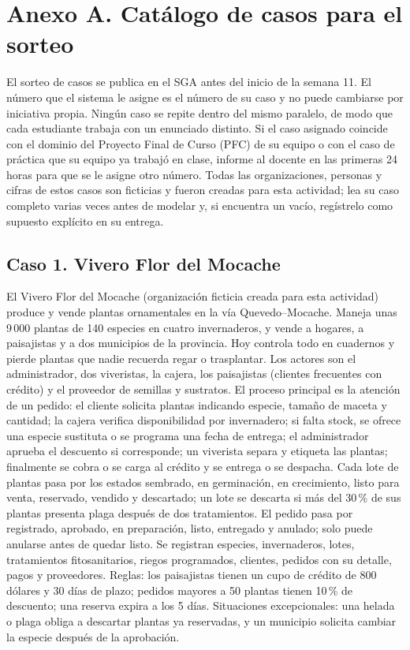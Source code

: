 \documentclass[11pt]{article}
\newcommand{\seccion}[1]{\section{\textcolor{utegreendk}{#1}}}
\newcommand{\subseccion}[1]{\subsection{\textcolor{midblue}{#1}}}
\begin{document}
\clearpage
\seccion{Anexo A. Catálogo de casos para el sorteo}

El sorteo de casos se publica en el SGA antes del inicio de la semana 11. El número que el sistema le asigne es el número de su caso y no puede cambiarse por iniciativa propia. Ningún caso se repite dentro del mismo paralelo, de modo que cada estudiante trabaja con un enunciado distinto. Si el caso asignado coincide con el dominio del Proyecto Final de Curso (PFC) de su equipo o con el caso de práctica que su equipo ya trabajó en clase, informe al docente en las primeras 24 horas para que se le asigne otro número. Todas las organizaciones, personas y cifras de estos casos son ficticias y fueron creadas para esta actividad; lea su caso completo varias veces antes de modelar y, si encuentra un vacío, regístrelo como supuesto explícito en su entrega.

\subseccion{Caso 1. Vivero Flor del Mocache}

El Vivero Flor del Mocache (organización ficticia creada para esta actividad) produce y vende plantas ornamentales en la vía Quevedo–Mocache. Maneja unas 9\,000 plantas de 140 especies en cuatro invernaderos, y vende a hogares, a paisajistas y a dos municipios de la provincia. Hoy controla todo en cuadernos y pierde plantas que nadie recuerda regar o trasplantar. Los actores son el administrador, dos viveristas, la cajera, los paisajistas (clientes frecuentes con crédito) y el proveedor de semillas y sustratos. El proceso principal es la atención de un pedido: el cliente solicita plantas indicando especie, tamaño de maceta y cantidad; la cajera verifica disponibilidad por invernadero; si falta stock, se ofrece una especie sustituta o se programa una fecha de entrega; el administrador aprueba el descuento si corresponde; un viverista separa y etiqueta las plantas; finalmente se cobra o se carga al crédito y se entrega o se despacha. Cada lote de plantas pasa por los estados sembrado, en germinación, en crecimiento, listo para venta, reservado, vendido y descartado; un lote se descarta si más del 30\,\% de sus plantas presenta plaga después de dos tratamientos. El pedido pasa por registrado, aprobado, en preparación, listo, entregado y anulado; solo puede anularse antes de quedar listo. Se registran especies, invernaderos, lotes, tratamientos fitosanitarios, riegos programados, clientes, pedidos con su detalle, pagos y proveedores. Reglas: los paisajistas tienen un cupo de crédito de 800 dólares y 30 días de plazo; pedidos mayores a 50 plantas tienen 10\,\% de descuento; una reserva expira a los 5 días. Situaciones excepcionales: una helada o plaga obliga a descartar plantas ya reservadas, y un municipio solicita cambiar la especie después de la aprobación.
\end{document}
